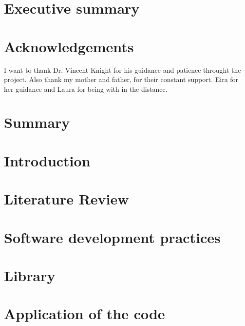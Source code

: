 \documentclass[12pt]{report}
\begin{document}
\thispagestyle{empty}



\thispagestyle{empty}
\chapter*{Executive summary}


\thispagestyle{empty}
\chapter*{Acknowledgements}
I want to thank Dr. Vincent Knight for his guidance and patience throught the project. Also thank my mother and father, for their constant support. Eira for her guidance and Laura for being with in the distance. 

\newpage
\thispagestyle{empty}
\tableofcontents

\newpage
\thispagestyle{empty}
\listoftables

\newpage
\thispagestyle{empty}
\listoffigures
 
\newpage
{}

\chapter*{Summary}


\chapter{Introduction}


\chapter{Literature Review}


\chapter{Software development practices}


\chapter{Library}


\chapter{Application of the code}

\end{document}
